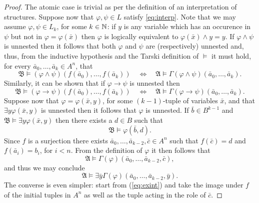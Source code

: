 \begin{proof}
	The atomic case is trivial as per the definition of an interpretation of structures.  Suppose now that $\varphi,\psi\in L$ satisfy \ref{eq:interp}.  Note that we may assume $\varphi,\psi\in L_k$, for some $k\in\mathbb{N}$:  if $y$ is any variable which has an occurence in $\psi$ but not in $\varphi=\varphi(\bar{x})$ then $\varphi$ is logically equivalent to $\varphi(\bar{x})\wedge y=y$.  If $\varphi\wedge\psi$ is unnested then it follows that both $\varphi$ and $\psi$ are (respectively) unnested and, thus, from the inductive hypothesis and the Tarski definition of $\models$ it must hold, for every $\bar{a}_0,\dotsc,\bar{a}_k\in A^n$, that
	\begin{equation}
		\mathfrak{B}\models(\varphi\wedge\psi)(f(\bar{a}_0),\dotsc,f(\bar{a}_k))\quad\iff\quad\mathfrak{A}\models\Gamma(\varphi\wedge\psi)(\bar{a}_0,\dotsc,\bar{a}_k).
	\end{equation}
	Similarly, it can be shown that if $\varphi\rightarrow\psi$ is unnested then
	\begin{equation}
		\mathfrak{B}\models(\varphi\rightarrow\psi)(f(\bar{a}_0),\dotsc,f(\bar{a}_k))\quad\iff\quad\mathfrak{A}\models\Gamma(\varphi\rightarrow\psi)(\bar{a}_0,\dotsc,\bar{a}_k).
	\end{equation}
	Suppose now that $\varphi=\varphi(\bar{x},y)$, for some $(k-1)$-tuple of variables $\bar{x}$, and that $\exists y\varphi(\bar{x},y)$ is unnested then it follows that $\varphi$ is unnested.  If $\bar{b}\in B^{k-1}$ and $\mathfrak{B}\models\exists y\varphi(\bar{x},y)$ then there exists a $d\in B$ such that
	\begin{equation}
		\mathfrak{B}\models\varphi(\bar{b},d).
	\end{equation}
	Since $f$ is a surjection there exists $\bar{a}_0,\dotsc,\bar{a}_{k-2},\bar{c}\in A^n$ such that $f(\bar{c})=d$ and $f(\bar{a}_i)=b_i$, for $i<n$.  From the definition of $\varphi$ it then follows that
	\begin{equation}
		\mathfrak{A}\models\Gamma(\varphi)(\bar{a}_0,\dotsc,\bar{a}_{k-2},\bar{c}),
	\end{equation}
	and thus we may conclude
	\begin{equation}
		\mathfrak{A}\models\exists\bar{y}\Gamma(\varphi)(\bar{a}_0,\dotsc,\bar{a}_{k-2},\bar{y}).\label{eq:exint}
	\end{equation}
	The converse is even simpler:  start from (\ref{eq:exint}) and take the image under $f$ of the initial tuples in $A^n$ as well as the tuple acting in the role of $\bar{c}$.
\end{proof}

